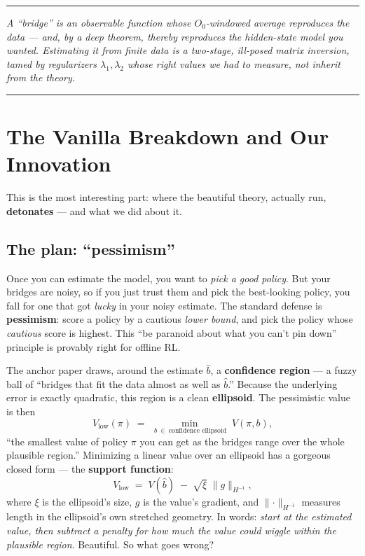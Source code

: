 \documentclass[11pt]{article}
\newenvironment{takeaway}
  {\par\vspace{4pt}\noindent\begin{center}\begin{minipage}{0.94\linewidth}%
   \color{black!88}\rule{\linewidth}{0.7pt}\par\vspace{3pt}\small\itshape}
  {\par\vspace{3pt}\rule{\linewidth}{0.7pt}\end{minipage}\end{center}\vspace{4pt}}
\newcommand{\Ob}{O_0}
\begin{document}
\begin{takeaway}
A ``bridge'' is an observable function whose $\Ob$-windowed average reproduces the
data --- and, by a deep theorem, thereby reproduces the hidden-state model you
wanted. Estimating it from finite data is a two-stage, ill-posed matrix inversion,
tamed by regularizers $\lambda_1,\lambda_2$ whose right values we had to \emph{measure},
not inherit from the theory.
\end{takeaway}

\section{The Vanilla Breakdown and Our Innovation}

This is the most interesting part: where the beautiful theory, actually run,
\textbf{detonates} --- and what we did about it.

\subsection{The plan: ``pessimism''}
Once you can estimate the model, you want to \emph{pick a good policy}. But your
bridges are noisy, so if you just trust them and pick the best-looking policy, you
fall for one that got \emph{lucky} in your noisy estimate. The standard defense is
\textbf{pessimism}: score a policy by a cautious \emph{lower bound}, and pick the
policy whose \emph{cautious} score is highest. This ``be paranoid about what you can't
pin down'' principle is provably right for offline RL.

The anchor paper draws, around the estimate $\hat b$, a \textbf{confidence region} ---
a fuzzy ball of ``bridges that fit the data almost as well as $\hat b$.'' Because the
underlying error is exactly quadratic, this region is a clean \textbf{ellipsoid}. The
pessimistic value is then
\[
V_{\text{low}}(\pi) \;=\; \min_{\,b\ \in\ \text{confidence ellipsoid}}\; V(\pi, b),
\]
``the smallest value of policy $\pi$ you can get as the bridges range over the whole
plausible region.'' Minimizing a linear value over an ellipsoid has a gorgeous
closed form --- the \textbf{support function}:
\begin{equation}
V_{\text{low}} \;=\; V(\hat b)\;-\;\sqrt{\xi}\;\lVert g\rVert_{H^{-1}},
\label{eq:supp}
\end{equation}
where $\xi$ is the ellipsoid's size, $g$ is the value's gradient, and
$\lVert\cdot\rVert_{H^{-1}}$ measures length in the ellipsoid's own stretched
geometry. In words: \emph{start at the estimated value, then subtract a penalty for
how much the value could wiggle within the plausible region}. Beautiful. So what
goes wrong?
\end{document}
